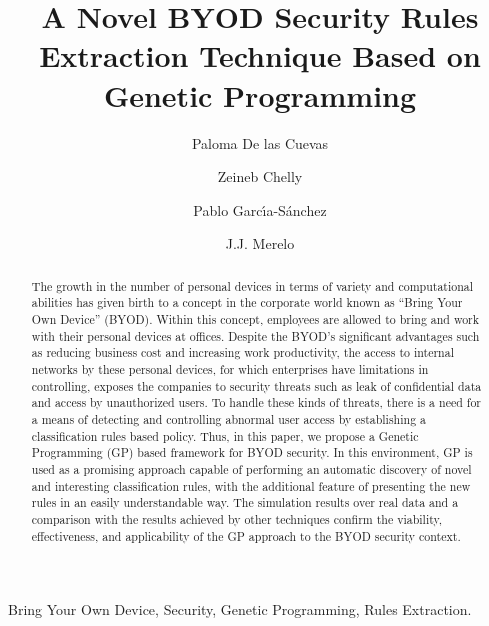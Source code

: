 \documentclass[a4paper,10pt,twocolumn,preprint,3p]{elsarticle}
\begin{document}
\begin{frontmatter}

\title{A Novel BYOD Security Rules Extraction Technique Based on Genetic Programming}

\author[ugr]{Paloma De las Cuevas}
\author[isgt]{Zeineb Chelly}
\author[ugr]{Pablo Garc\'{\i}a-S\'anchez}
\author[ugr]{J.J. Merelo}

\address[ugr]{Department of Computer Architecture and Computer Technology, ETSIIT and CITIC \\
University of Granada, Granada, Spain. Tel: +34958241778. Fax: +34958248993}
\address[isgt]{LARODEC, Institut Sup\'erieur de Gestion de Tunis, Tunisia.}


\begin{abstract}
The growth in the number of personal devices in terms of variety and computational
abilities has given birth to a 
concept in the corporate world
known as ``Bring Your Own Device'' (BYOD).
Within this concept,
employees are allowed to bring and work with their personal devices at
offices. Despite the BYOD's significant advantages such as reducing
business cost and increasing work productivity, the access to internal networks by these personal devices, for which
enterprises have limitations in controlling, exposes the companies to
security threats such as leak of confidential data and access by
unauthorized users. To handle these kinds of threats,
 there
is a need for a means of detecting and controlling abnormal user
access by establishing a classification rules based policy. Thus, in
this paper, we propose a Genetic Programming (GP) based framework for
BYOD security. In this environment, GP is used as a promising approach
capable of performing an automatic discovery of novel and interesting
classification rules, with the additional feature of presenting the new rules in an easily understandable way.
The simulation results over real data and a
comparison with the results achieved by other techniques confirm the
viability, effectiveness, and applicability of the GP approach to the
BYOD security context.
\end{abstract}


\begin{keyword}
Bring Your Own Device, Security, Genetic Programming, Rules Extraction. 
\end{keyword}

\end{frontmatter}
\end{document}
